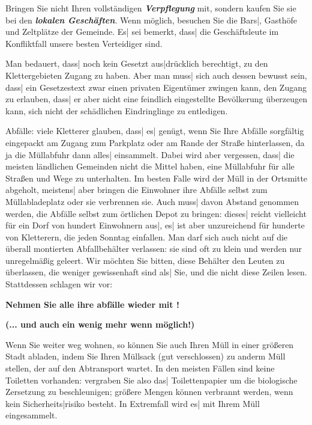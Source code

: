\documentclass[12pt]{article}
\def\Ital#1{{\bfseries\slshape #1\/}}
\def\3{\ss}
\begin{document}
 Bringen Sie nicht Ihren vollst\"andigen \Ital{Verpflegung} mit, sondern kaufen
Sie sie bei den \Ital{lokalen Gesch\"aften}. Wenn m\"oglich, besuchen Sie die
Bars|, Gasth\"ofe und Zeltpl\"atze der Gemeinde. Es| sei bemerkt, das{}s| die
Gesch\"aftsleute im Konfliktfall unsere besten Verteidiger sind.

 Man bedauert, das{}s| noch kein Gesetzt aus|dr\"ucklich berechtigt, zu
den Klettergebieten Zugang zu haben. Aber man mus{}s| sich auch dessen
bewusst sein, das{}s| ein Gesetzestext zwar einen privaten Eigent\"umer
zwingen kann, den Zugang zu erlauben, das{}s| er aber nicht eine
feindlich eingestellte Bev\"olkerung \"uberzeugen kann, sich nicht der
sch\"adlichen Eindringlinge zu entledigen.

\medskip
 Abf\"alle: viele Kletterer glauben, das{}s| es| gen\"ugt, wenn Sie Ihre
Abf\"alle sorgf\"altig eingepackt am Zugang zum Parkplatz oder am Rande
der Stra\3e hinterlassen, da ja die M\"ullabfuhr dann alles| einsammelt.
Dabei wird aber vergessen, das{}s| die meisten l\"andlichen Gemeinden nicht
die Mittel haben, eine M\"ullabfuhr f\"ur alle Stra\3en und Wege zu
unterhalten. Im besten Falle wird der M\"ull in der Ortsmitte abgeholt,
meistens| aber bringen die Einwohner ihre Abf\"alle selbst zum
M\"ullabladeplatz oder sie verbrennen sie. Auch mus{}s| davon Abstand
genommen werden, die Abf\"alle selbst zum \"ortlichen Depot zu bringen:
dieses| reicht vielleicht f\"ur ein Dorf von hundert Einwohnern aus|, es|
ist aber unzureichend f\"ur hunderte von Kletterern, die jeden Sonntag
einfallen. Man darf sich auch nicht auf die \"uberall montierten
Abfallbeh\"alter verlassen: sie sind oft zu klein und werden nur
unregelm\"a\3ig geleert. Wir m\"ochten Sie bitten, diese Beh\"alter den
Leuten zu \"uberlassen, die weniger gewissenhaft sind als| Sie, und die
nicht diese Zeilen lesen. Stattdessen schlagen wir vor:

 \medskip\centerline{\LARGE\bf Nehmen Sie alle ihre abf\"alle wieder mit !}

\centerline{\Large\bf(... und auch ein wenig mehr wenn m\"oglich!)}

\medskip
 Wenn Sie weiter weg wohnen, so k\"onnen Sie auch Ihren M\"ull in einer
gr\"o\3eren Stadt abladen, indem Sie Ihren M\"ullsack (gut verschlossen) zu
anderm M\"ull stellen, der auf den Abtransport wartet. In den meisten
F\"allen sind keine Toiletten vorhanden: vergraben Sie also das|
Toilettenpapier um die biologische Zersetzung zu beschleunigen; gr\"o\3ere
Mengen k\"onnen verbrannt werden, wenn kein Sicherheits|risiko besteht. In
Extremfall wird es| mit Ihrem M\"ull eingesammelt.
\end{document}
